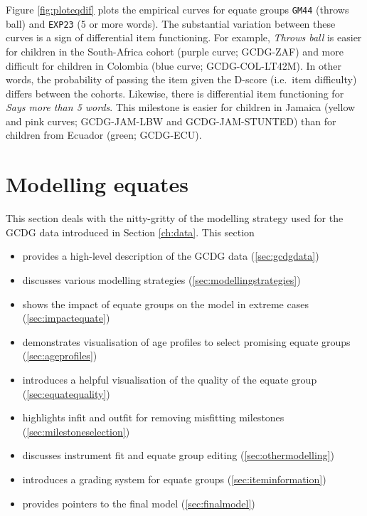 \documentclass[
]{book}
\providecommand{\tightlist}{%
  \setlength{\itemsep}{0pt}\setlength{\parskip}{0pt}}
\begin{document}
Figure \ref{fig:ploteqdif} plots the empirical curves for equate groups \texttt{GM44} (throws ball) and \texttt{EXP23} (5 or more words). The substantial variation between these curves is a sign of differential item functioning. For example, \emph{Throws ball} is easier for children in the South-Africa cohort (purple curve; GCDG-ZAF) and more difficult for children in Colombia (blue curve; GCDG-COL-LT42M). In other words, the probability of passing the item given the D-score (i.e.~item difficulty) differs between the cohorts. Likewise, there is differential item functioning for \emph{Says more than 5 words}. This milestone is easier for children in Jamaica (yellow and pink curves; GCDG-JAM-LBW and GCDG-JAM-STUNTED) than for children from Ecuador (green; GCDG-ECU).

\hypertarget{ch:modellingequates}{%
\chapter{Modelling equates}\label{ch:modellingequates}}

This section deals with the nitty-gritty of the modelling strategy used for the GCDG data introduced in Section \ref{ch:data}. This section

\begin{itemize}
\tightlist
\item
  provides a high-level description of the GCDG data (\ref{sec:gcdgdata})
\item
  discusses various modelling strategies (\ref{sec:modellingstrategies})
\item
  shows the impact of equate groups on the model in extreme cases (\ref{sec:impactequate})
\item
  demonstrates visualisation of age profiles to select promising equate groups (\ref{sec:ageprofiles})
\item
  introduces a helpful visualisation of the quality of the equate group (\ref{sec:equatequality})
\item
  highlights infit and outfit for removing misfitting milestones (\ref{sec:milestoneselection})
\item
  discusses instrument fit and equate group editing (\ref{sec:othermodelling})
\item
  introduces a grading system for equate groups (\ref{sec:iteminformation})
\item
  provides pointers to the final model (\ref{sec:finalmodel})
\end{itemize}
\end{document}
